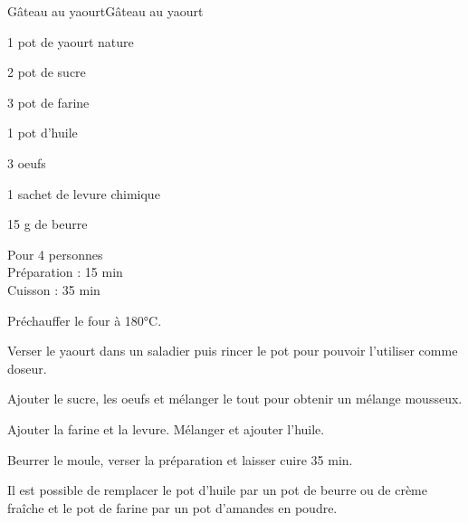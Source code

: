 \begin{recette}{Gâteau au yaourt}{Gâteau au yaourt}

\begin{ingredients}
1 pot de yaourt nature\par
2 pot de sucre\par
3 pot de farine\par
1 pot d'huile\par
3 oeufs\par
1 sachet de levure chimique\par
15 g de beurre\par
\end{ingredients}

\begin{infos}
Pour 4 personnes\\
Préparation : 15 min\\
Cuisson : 35 min\\
\end{infos}

\begin{etapes}
\item Préchauffer le four à 180°C.
\item Verser le yaourt dans un saladier puis rincer le pot pour pouvoir l'utiliser comme doseur.
\item Ajouter le sucre, les oeufs et mélanger le tout pour obtenir un mélange mousseux.
\item Ajouter la farine et la levure. Mélanger et ajouter l'huile.
\item Beurrer le moule, verser la préparation et laisser cuire 35 min.
\end{etapes}

\begin{conseils}
Il est possible de remplacer le pot d'huile par un pot de beurre ou de crème fraîche et le pot de farine par un pot d'amandes en poudre.
\end{conseils}

\end{recette}